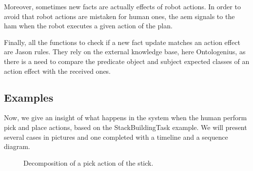 \documentclass[a4paper,11pt,twoside]{StyleThese}
\begin{document}
Moreover, sometimes new facts are actually effects of robot actions. In order to avoid that robot actions are mistaken for human ones, the \acrshort{aem} signals to the \acrlong{ham} when the robot executes a given action of the plan. 

Finally, all the functions to check if a new fact update matches an action effect are Jason rules. They rely on the external knowledge base, here Ontologenius, as there is a need to compare the predicate object and subject expected classes of an action effect with the received ones.

\thispagestyle{example}
\subsection*{Examples}
Now, we give an insight of what happens in the system when the human perform pick and place actions, based on the StackBuildingTask example. We will present several cases in pictures and one completed with a timeline and a sequence diagram.

\begin{figure}[!htp]
	\hfill
	\hfill
	\hfill
	\caption{Decomposition of a pick action of the stick.}
	\label{chap6:fig:action_monitoring_photos_pick}
\end{figure}
\end{document}
